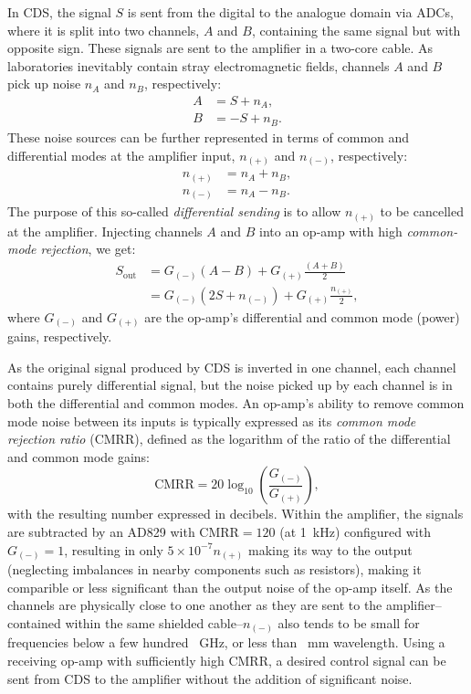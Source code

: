 In \gls{CDS}, the signal $S$ is sent from the digital to the analogue domain via \gls{ADC}s, where it is split into two channels, $A$ and $B$, containing the same signal but with opposite sign. These signals are sent to the amplifier in a two-core cable. As laboratories inevitably contain stray electromagnetic fields, channels $A$ and $B$ pick up noise $n_{A}$ and $n_{B}$, respectively:
\begin{align}
  A &= S + n_{A}, \\
  B &= -S + n_{B}.
\end{align}
These noise sources can be further represented in terms of common and differential modes at the amplifier input, $n_{\left(+\right)}$ and $n_{\left(-\right)}$, respectively:
\begin{align}
  n_{\left(+\right)} &= n_{A} + n_{B}, \\
  n_{\left(-\right)} &= n_{A} - n_{B}.
\end{align}
The purpose of this so-called \emph{differential sending} is to allow $n_{\left(+\right)}$ to be cancelled at the amplifier. Injecting channels $A$ and $B$ into an op-amp with high \emph{common-mode rejection}, we get:
\begin{align}
  S_{\text{out}} &= G_{\left(-\right)} \left(A - B\right) + G_{\left(+\right)} \frac{\left(A + B\right)}{2} \\
                 &= G_{\left(-\right)} \left(2S + n_{\left(-\right)}\right) + G_{\left(+\right)} \frac{n_{\left(+\right)}}{2},
\end{align}
where $G_{\left(-\right)}$ and $G_{\left(+\right)}$ are the op-amp's differential and common mode (power) gains, respectively.

As the original signal produced by \gls{CDS} is inverted in one channel, each channel contains purely differential signal, but the noise picked up by each channel is in both the differential and common modes. An op-amp's ability to remove common mode noise between its inputs is typically expressed as its \emph{common mode rejection ratio} (\gls{CMRR}), defined as the logarithm of the ratio of the differential and common mode gains:
\begin{equation}
  \text{CMRR} = 20 \log_{10} \left( \frac{G_{\left(-\right)}}{G_{\left(+\right)}} \right),
\end{equation}
with the resulting number expressed in decibels. Within the amplifier, the signals are subtracted by an AD829 with $\text{CMRR} = 120$ (at \SI{1}{\kilo\hertz}) configured with $G_{\left(-\right)} = 1$, resulting in only $5 \times 10^{-7} n_{\left(+\right)}$ making its way to the output (neglecting imbalances in nearby components such as resistors), making it comparible or less significant than the output noise of the op-amp itself. As the channels are physically close to one another as they are sent to the amplifier--contained within the same shielded cable--$n_{\left(-\right)}$ also tends to be small for frequencies below a few hundred \SI{}{\giga\hertz}, or less than \SI{}{\milli\meter} wavelength. Using a receiving op-amp with sufficiently high \gls{CMRR}, a desired control signal can be sent from \gls{CDS} to the amplifier without the addition of significant noise.

